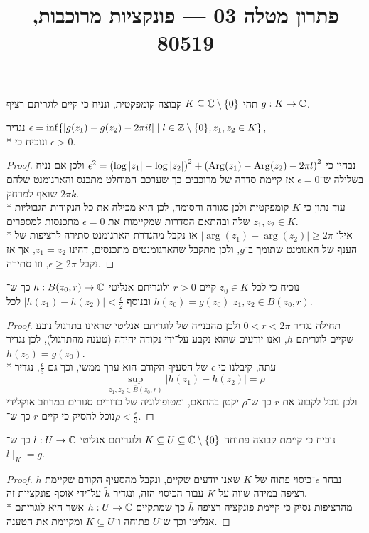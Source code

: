 
\title{פתרון מטלה 03 --- פונקציות מרוכבות, 80519}


\maketitle
\maketitleprint{}

\Question{}
תהי $K \subseteq \mathbb{C} \setminus \{ 0 \}$ קבוצה קומפקטית, ונניח כי קיים לוגריתם רציף $g : K \to \mathbb{C}$.

\Subquestion{}
נגדיר $\epsilon = \inf \{ |g(z_1) - g(z_2) - 2 \pi i l| \mid l \in \mathbb{Z} \setminus \{ 0 \}, z_1, z_2 \in K \}$, \\*
ונוכיח כי $\epsilon > 0$.
\begin{proof}
	נבחין כי $\epsilon^2 = {(\log|z_1| - \log|z_2|)}^2 + {(\operatorname{Arg}(z_1) - \operatorname{Arg}(z_2) - 2 \pi l)}^2$ ולכן אם נניח בשלילה ש־$\epsilon = 0$ אז קיימת סדרה של מרוכבים כך שערכם המוחלט מתכנס והארגומנט שלהם שואף למרחק $2\pi k$. \\*
	עוד נתון כי $K$ קומפקטית ולכן סגורה וחסומה, לכן היא מכילה את כל הנקודות הגבוליות שלה ובהתאם הסדרות שמקיימות את $\epsilon = 0$ מתכנסות למספרים $z_1, z_2 \in K$. \\*
	אילו $|\arg(z_1) - \arg(z_2)| \ge 2\pi$ אז נקבל מהגדרת הארגומנט סתירה לרציפות של הענף של האגומנט שתומך ב־$g$, ולכן מתקבל שהארגומנטים מתכנסים, דהינו $z_1 = z_2$, אך אז נקבל $\epsilon \ge 2\pi$, וזו סתירה.
\end{proof}

\Subquestion{}
נוכיח כי לכל $z_0 \in K$ קיים $r > 0$ ולוגריתם אנליטי $h : B(z_0, r) \to \mathbb{C}$ כך ש־$h(z_0) = g(z_0)$ ובנוסף $|h(z_1) - h(z_2)| < \frac{\epsilon}{2}$ לכל $z_1, z_2 \in B(z_0, r)$.
\begin{proof}
	תחילה נגדיר $0 < r < 2 \pi$ ולכן מהבנייה של לוגריתם אנליטי שראינו בתרגול נובע שקיים לוגריתם $h$, ואנו יודעים שהוא נקבע על־ידי נקודה יחידה (טענה מהתרגול), לכן נגדיר $h(z_0) = g(z_0)$. \\*
	עתה, קיבלנו כי $\epsilon$ של הסעיף הקודם הוא ערך ממשי, וכך גם $\frac{\epsilon}{3}$, נגדיר
	\[
		\sup_{z_1, z_2 \in \overline{B}(z_0, r)} |h(z_1) - h(z_2)| = \rho
	\]
	ולכן נוכל לקבוע את $r$ כך ש־$\rho$ יקטן בהתאם, ומטופולוגיה של כדורים סגורים במרחב אוקלידי נוכל להסיק כי קיים $r$ כך ש־$\rho < \frac{\epsilon}{3}$.
\end{proof}

\Subquestion{}
נוכיח כי קיימת קבוצה פתוחה $K \subseteq U \subseteq \mathbb{C} \setminus \{ 0 \}$ ולוגריתם אנליטי $l : U \to \mathbb{C}$ כך ש־$l \mid_K = g$.
\begin{proof}
	נבחר $\epsilon$־כיסוי פתוח של $K$ שאנו יודעים שקיים, ונקבל מהסעיף הקודם שקיימת $h$ רציפה במידה שווה על $K$ עבור הכיסוי הזה, ונגדיר $\tilde{h}$ על־ידי אוסף פונקציות זה. \\*
	מהרציפות נסיק כי קיימת פונקציה רציפה $\bar{h}$ כך שמתקיים $\bar{h} : U \to \mathbb{C}$ אשר היא לוגריתם אנליטי וכך ש־$U$ פתוחה ו־$K \subseteq U$ ומקיימת את הטענה.
\end{proof}

